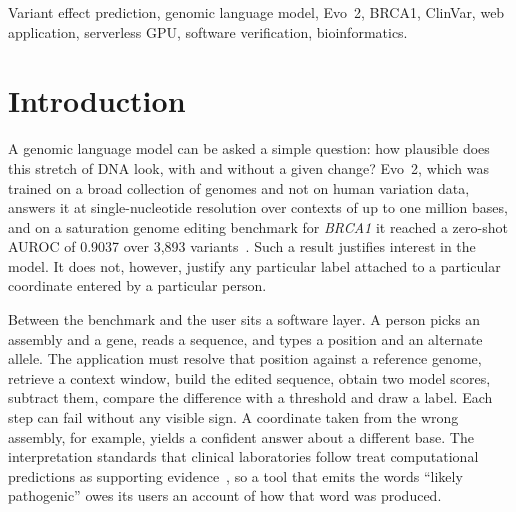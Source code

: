 \documentclass[10pt,journal,a4paper]{IEEEtran}
\begin{document}
\begin{IEEEkeywords}
Variant effect prediction, genomic language model, Evo~2, BRCA1, ClinVar, web application, serverless GPU, software verification, bioinformatics.
\end{IEEEkeywords}

\section{Introduction}
A genomic language model can be asked a simple question: how plausible does this stretch of DNA look, with and without a given change? Evo~2, which was trained on a broad collection of genomes and not on human variation data, answers it at single-nucleotide resolution over contexts of up to one million bases, and on a saturation genome editing benchmark for \emph{BRCA1} it reached a zero-shot AUROC of 0.9037 over 3{,}893 variants~\cite{brixi2026evo2,findlay2018brca1}. Such a result justifies interest in the model. It does not, however, justify any particular label attached to a particular coordinate entered by a particular person.

Between the benchmark and the user sits a software layer. A person picks an assembly and a gene, reads a sequence, and types a position and an alternate allele. The application must resolve that position against a reference genome, retrieve a context window, build the edited sequence, obtain two model scores, subtract them, compare the difference with a threshold and draw a label. Each step can fail without any visible sign. A coordinate taken from the wrong assembly, for example, yields a confident answer about a different base. The interpretation standards that clinical laboratories follow treat computational predictions as supporting evidence~\cite{richards2015acmg}, so a tool that emits the words ``likely pathogenic'' owes its users an account of how that word was produced.
\end{document}
